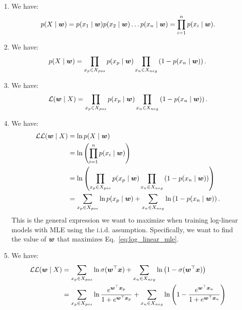 \documentclass[11pt,a4paper]{article}
\begin{document}
\begin{enumerate}[label=(\alph*)]
    \item We have:
          \begin{align}
              p(X\mid{\boldsymbol{w}}) = p(x_1\mid{\boldsymbol{w}})p(x_2\mid{\boldsymbol{w}})\ldots p(x_n\mid{\boldsymbol{w}}) = \prod_{i=1}^{n}p(x_i\mid{\boldsymbol{w}}).
          \end{align}
    \item We have:
          \begin{align}
              p(X\mid{\boldsymbol{w}}) = \prod_{x_p\in X_{pos}}p(x_p\mid{\boldsymbol{w}})\prod_{x_n\in X_{neg}}\left(1 - p(x_n\mid{\boldsymbol{w}})\right).
          \end{align}
    \item We have:
          \begin{align}
              \mathcal{L}({\boldsymbol{w}}\mid X) = \prod_{x_p\in X_{pos}}p(x_p\mid{\boldsymbol{w}})\prod_{x_n\in X_{neg}}\left(1 - p(x_n\mid{\boldsymbol{w}})\right).
          \end{align}
    \item We have:
          \begin{align}
              \mathcal{LL}({\boldsymbol{w}}\mid X) & = \ln p(X\mid{\boldsymbol{w}})                                                                                                             \\
                                  & = \ln \left(\prod_{i=1}^{n}p(x_i\mid{\boldsymbol{w}})\right)                                                                               \\
                                  & = \ln \left(\prod_{x_p\in X_{pos}}p(x_p\mid{\boldsymbol{w}})\prod_{x_n\in X_{neg}}\left(1 - p(x_n\mid{\boldsymbol{w}})\right)\right)                    \\
                                  & = \sum_{x_p\in X_{pos}}\ln p(x_p\mid{\boldsymbol{w}}) + \sum_{x_n\in X_{neg}}\ln\left(1 - p(x_n\mid{\boldsymbol{w}})\right). \label{eq:log_linear_mle}
          \end{align}
          This is the general expression we want to maximize when training log-linear models with MLE using the i.i.d.
          assumption. Specifically, we want to find the value of ${\boldsymbol{w}}$ that maximizes Eq.~\ref{eq:log_linear_mle}.
    \item We have:
          \begin{align}
              \set{LL}(\vw\mid X) & = \sum_{x_p\in X_{pos}}\ln\sigma(\vw^\top\vx) + \sum_{x_n\in X_{neg}}\ln\left(1 - \sigma(\vw^\top\vx)\right)                                                          \\
                                  & = \sum_{x_p\in X_{pos}}\ln \frac{e^{\vw^\top\vx_p}}{1 + e^{\vw^\top\vx_p}} + \sum_{x_n\in X_{neg}}\ln\left(1 - \frac{e^{\vw^\top\vx_n}}{1 + e^{\vw^\top\vx_n}}\right) \\

\end{align}
\end{enumerate}
\end{document}
